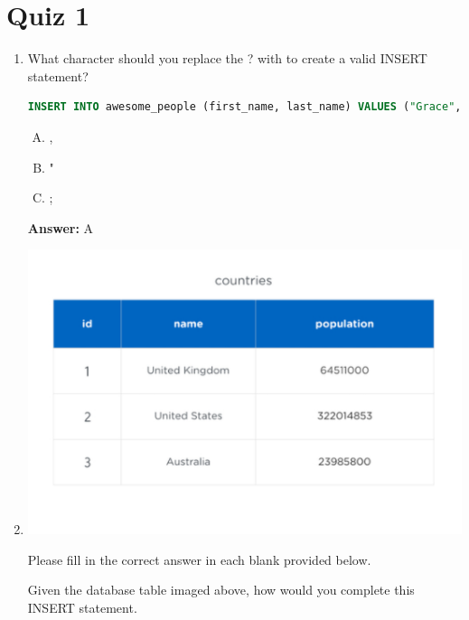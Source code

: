 \documentclass[12pt]{article}
\begin{document}
\bigskip

\section{Quiz 1}

\bigskip


\begin{enumerate}[1.]
    \item

    What character should you replace the ? with to create a valid INSERT
    statement?

    \bigskip

    \begin{lstlisting}[language=SQL]
    INSERT INTO awesome_people (first_name, last_name) VALUES ("Grace", "Hopper")? ("Ada", "Lovelace");
    \end{lstlisting}

    \begin{enumerate}[A.]
        \item ,
        \item "
        \item ;
    \end{enumerate}

    \bigskip

    \textbf{Answer:} A

    \item

    \begin{center}
    \includegraphics[width=0.8 \linewidth]{images/part_1_notes_1.png}
    \end{center}

    Please fill in the correct answer in each blank provided below.

    \bigskip

    Given the database table imaged above, how would you complete this INSERT statement.


\end{enumerate}
\end{document}
